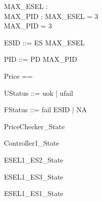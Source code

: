 \documentclass{article}
\begin{document}

\begin{axdef}
	MAX\_ESEL : \nat \\
 MAX\_PID : \nat 
\where
 MAX\_ESEL = 3 \\
 MAX\_PID = 3
\end{axdef}

\begin{zed}
	ESID ::= ES  \upto MAX\_ESEL \rdata
\end{zed}

\begin{zed}
	PID ::= PD  \upto MAX\_PID \rdata
\end{zed}

\begin{zed}
	Price == \nat
\end{zed}

\begin{zed}
	UStatus ::= uok | ufail
\end{zed}

\begin{zed}
	FStatus ::= fail \ldata ESID \rdata | NA
\end{zed}

\begin{zed}
	PriceChecker\_State 
\end{zed}

\begin{zed}
	Controller1\_State 
\end{zed}

\begin{zed}
	ESEL1\_ES2\_State 
\end{zed}

\begin{zed}
	ESEL1\_ES3\_State 
\end{zed}

\begin{zed}
	ESEL1\_ES1\_State 
\end{zed}
\end{document}
